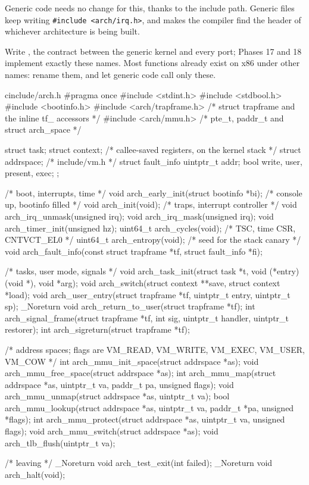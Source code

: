 \documentclass[11pt,a4paper]{article}
\begin{document}
Generic code needs no change for this, thanks to the include path. Generic files keep writing
\texttt{\#include <arch/irq.h>}, and  makes the compiler find
the header of whichever architecture is being built.

Write , the contract between the generic kernel and every port; Phases 17 and 18 implement
exactly these names. Most functions already exist on x86 under other names: rename them, and let generic code call
only these.

\begin{lst}{c}{include/arch.h}
#pragma once
#include <stdint.h>
#include <stdbool.h>
#include <bootinfo.h>
#include <arch/trapframe.h>    /* struct trapframe and the inline tf_ accessors */
#include <arch/mmu.h>          /* pte_t, paddr_t and struct arch_space          */

struct task;
struct context;                /* callee-saved registers, on the kernel stack */
struct addrspace;              /* include/vm.h                                 */
struct fault_info { uintptr_t addr; bool write, user, present, exec; };

/* boot, interrupts, time */
void     arch_early_init(struct bootinfo *bi);   /* console up, bootinfo filled */
void     arch_init(void);                        /* traps, interrupt controller  */
void     arch_irq_unmask(unsigned irq);
void     arch_irq_mask(unsigned irq);
void     arch_timer_init(unsigned hz);
uint64_t arch_cycles(void);                      /* TSC, time CSR, CNTVCT_EL0    */
uint64_t arch_entropy(void);                     /* seed for the stack canary    */
void     arch_fault_info(const struct trapframe *tf, struct fault_info *fi);

/* tasks, user mode, signals */
void     arch_task_init(struct task *t, void (*entry)(void *), void *arg);
void     arch_switch(struct context **save, struct context *load);
void     arch_user_entry(struct trapframe *tf, uintptr_t entry, uintptr_t sp);
_Noreturn void arch_return_to_user(struct trapframe *tf);
int      arch_signal_frame(struct trapframe *tf, int sig, uintptr_t handler, uintptr_t restorer);
int      arch_sigreturn(struct trapframe *tf);

/* address spaces; flags are VM_READ, VM_WRITE, VM_EXEC, VM_USER, VM_COW */
int      arch_mmu_init_space(struct addrspace *as);
void     arch_mmu_free_space(struct addrspace *as);
int      arch_mmu_map(struct addrspace *as, uintptr_t va, paddr_t pa, unsigned flags);
void     arch_mmu_unmap(struct addrspace *as, uintptr_t va);
bool     arch_mmu_lookup(struct addrspace *as, uintptr_t va, paddr_t *pa, unsigned *flags);
int      arch_mmu_protect(struct addrspace *as, uintptr_t va, unsigned flags);
void     arch_mmu_switch(struct addrspace *as);
void     arch_tlb_flush(uintptr_t va);

/* leaving */
_Noreturn void arch_test_exit(int failed);
_Noreturn void arch_halt(void);
\end{lst}
\end{document}

